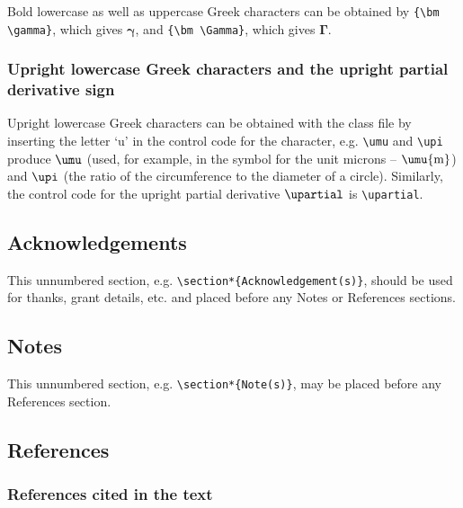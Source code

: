 \documentclass{tADR2e}
\begin{document}
Bold lowercase as well as uppercase Greek characters can be
obtained by \verb"{\bm \gamma}", which gives ${\bm \gamma}$, and
\verb"{\bm \Gamma}", which gives ${\bm \Gamma}$.


\subsubsection{Upright lowercase Greek characters and the upright partial derivative sign}\label{upgreek}

Upright lowercase Greek characters can be obtained with the class file by inserting the letter `u' in the control
code for the character, e.g. \verb"\umu" and \verb"\upi" produce $\umu$ (used, for example, in the symbol for the
unit microns -- $\umu{\rm m}$) and $\upi$ (the ratio of the circumference to the diameter of a circle). Similarly,
the control code for the upright partial derivative $\upartial$ is \verb"\upartial".

\subsection{Acknowledgements}

This unnumbered section, e.g. \verb"\section*{Acknowledgement(s)}", should be used for thanks, grant details, etc.
and placed before any Notes or References sections.

\subsection{Notes}

This unnumbered section, e.g. \verb"\section*{Note(s)}", may be placed before any References section.


\subsection{References}\label{refs}

\subsubsection{References cited in the text}
\end{document}
